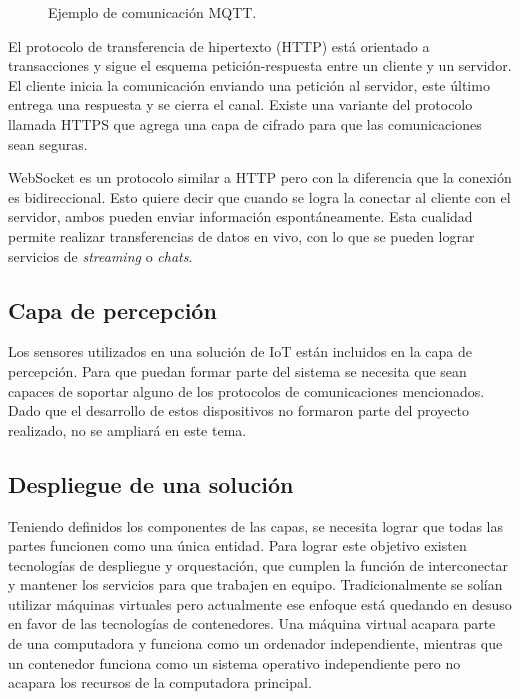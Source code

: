\begin{figure}[h]
	\centering
	\caption{Ejemplo de comunicación MQTT.}
	\label{fig:ch1MqttEjemplo}
\end{figure}

El protocolo de transferencia de hipertexto (HTTP) está orientado a transacciones y sigue el esquema petición-respuesta entre un cliente y un servidor.
El cliente inicia la comunicación enviando una petición al servidor, este último entrega una respuesta y se cierra el canal.
Existe una variante del protocolo llamada HTTPS que agrega una capa de cifrado para que las comunicaciones sean seguras.

WebSocket es un protocolo similar a HTTP pero con la diferencia que la conexión es bidireccional.
Esto quiere decir que cuando se logra la conectar al cliente con el servidor, ambos pueden enviar información espontáneamente. Esta cualidad permite realizar transferencias de datos en vivo, con lo que se pueden lograr servicios de \emph{streaming} o \emph{chats}.

\subsection{Capa de percepción}
Los sensores utilizados en una solución de IoT están incluidos en la capa de percepción.
Para que puedan formar parte del sistema se necesita que sean capaces de soportar alguno de los protocolos de comunicaciones mencionados. Dado que el desarrollo de estos dispositivos no formaron parte del proyecto realizado, no se ampliará en este tema.

\subsection{Despliegue de una solución}
Teniendo definidos los componentes de las capas, se necesita lograr que todas las partes funcionen como una única entidad. Para lograr este objetivo existen tecnologías de despliegue y orquestación, que cumplen la función de interconectar y mantener los servicios para que trabajen en equipo. Tradicionalmente se solían utilizar máquinas virtuales pero actualmente ese enfoque está quedando en desuso en favor de las tecnologías de contenedores. Una máquina virtual acapara parte de una computadora y funciona como un ordenador independiente, mientras que un contenedor funciona como un sistema operativo independiente pero no acapara los recursos de la computadora principal.

